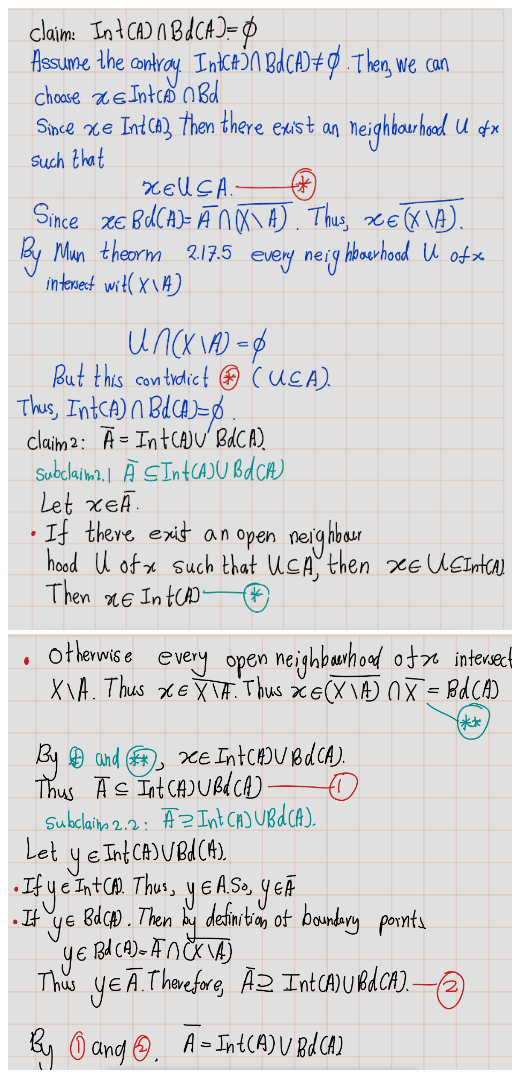 \documentclass[
]{book}
\theoremstyle{definition}
\theoremstyle{definition}
\theoremstyle{definition}
\theoremstyle{definition}
\theoremstyle{remark}
\begin{document}
\includegraphics{figures/Exercises/Ex 2.17/ex-19-1.png}
\includegraphics{figures/Exercises/Ex 2.17/ex-19-2.png}
\end{document}
